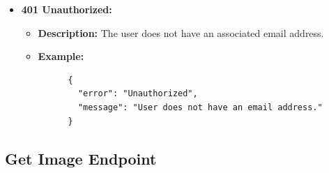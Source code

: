 \documentclass[a4 paper, 12pt]{article}
\begin{document}
\begin{enumerate}
\begin{itemize}
    \item \textbf{401 Unauthorized:}
    \begin{itemize}
      \item \textbf{Description:} The user does not have an associated email address.
      \item \textbf{Example:}
      \begin{verbatim}
      {
        "error": "Unauthorized",
        "message": "User does not have an email address."
      }
      \end{verbatim}
    \end{itemize}
  \end{itemize}
\end{enumerate}
\subsection{Get Image Endpoint}
\end{document}
